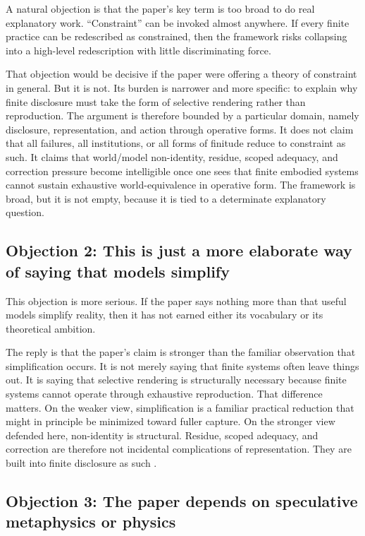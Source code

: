 \documentclass[11pt]{article}
\begin{document}
A natural objection is that the paper's key term is too broad to do real explanatory work. ``Constraint'' can be invoked almost anywhere. If every finite practice can be redescribed as constrained, then the framework risks collapsing into a high-level redescription with little discriminating force.

That objection would be decisive if the paper were offering a theory of constraint in general. But it is not. Its burden is narrower and more specific: to explain why finite disclosure must take the form of selective rendering rather than reproduction. The argument is therefore bounded by a particular domain, namely disclosure, representation, and action through operative forms. It does not claim that all failures, all institutions, or all forms of finitude reduce to constraint as such. It claims that world/model non-identity, residue, scoped adequacy, and correction pressure become intelligible once one sees that finite embodied systems cannot sustain exhaustive world-equivalence in operative form. The framework is broad, but it is not empty, because it is tied to a determinate explanatory question.

\subsection{Objection 2: This is just a more elaborate way of saying that models simplify}

This objection is more serious. If the paper says nothing more than that useful models simplify reality, then it has not earned either its vocabulary or its theoretical ambition.

The reply is that the paper's claim is stronger than the familiar observation that simplification occurs. It is not merely saying that finite systems often leave things out. It is saying that selective rendering is structurally necessary because finite systems cannot operate through exhaustive reproduction. That difference matters. On the weaker view, simplification is a familiar practical reduction that might in principle be minimized toward fuller capture. On the stronger view defended here, non-identity is structural. Residue, scoped adequacy, and correction are therefore not incidental complications of representation. They are built into finite disclosure as such \cite{FriggNguyen2021ScientificRepresentationSEP,FriggHartmann2025ModelsScienceSEP}.

\subsection{Objection 3: The paper depends on speculative metaphysics or physics}
\end{document}
